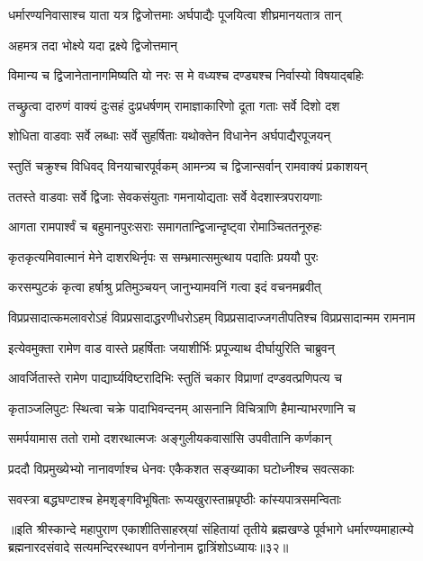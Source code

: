 \twolineshloka
{धर्मारण्यनिवासाश्च याता यत्र द्विजोत्तमाः}
{अर्घपाद्यैः पूजयित्वा शीघ्रमानयतात्र तान्}%

\onelineshloka
{अहमत्र तदा भोक्ष्ये यदा द्रक्ष्ये द्विजोत्तमान्}%

\twolineshloka
{विमान्य च द्विजानेतानागमिष्यति यो नरः}
{स मे वध्यश्च दण्ड्यश्च निर्वास्यो विषयाद्बहिः}%

\twolineshloka
{तच्छ्रुत्वा दारुणं वाक्यं दुःसहं दुःप्रधर्षणम्}
{रामाज्ञाकारिणो दूता गताः सर्वे दिशो दश}%

\twolineshloka
{शोधिता वाडवाः सर्वे लब्धाः सर्वे सुहर्षिताः}
{यथोक्तेन विधानेन अर्घपाद्यैरपूजयन्}%

\twolineshloka
{स्तुतिं चक्रुश्च विधिवद् विनयाचारपूर्वकम्}
{आमन्त्र्य च द्विजान्सर्वान् रामवाक्यं प्रकाशयन्}%

\twolineshloka
{ततस्ते वाडवाः सर्वे द्विजाः सेवकसंयुताः}
{गमनायोद्यताः सर्वे वेदशास्त्रपरायणाः}%

\twolineshloka
{आगता रामपार्श्वं च बहुमानपुरःसराः}
{समागतान्द्विजान्दृष्ट्वा रोमाञ्चिततनूरुहः}%

\twolineshloka
{कृतकृत्यमिवात्मानं मेने दाशरथिर्नृपः}
{स सम्भ्रमात्समुत्थाय पदातिः प्रययौ पुरः}%

\twolineshloka
{करसम्पुटकं कृत्वा हर्षाश्रु प्रतिमुञ्चयन्}
{जानुभ्यामवनिं गत्वा इदं वचनमब्रवीत्}%

\twolineshloka
{विप्रप्रसादात्कमलावरोऽहं विप्रप्रसादाद्धरणीधरोऽहम्}
{विप्रप्रसादाज्जगतीपतिश्च विप्रप्रसादान्मम रामनाम}%

\twolineshloka
{इत्येवमुक्ता रामेण वाड वास्ते प्रहर्षिताः}
{जयाशीर्भिः प्रपूज्याथ दीर्घायुरिति चाब्रुवन्}%

\twolineshloka
{आवर्जितास्ते रामेण पाद्यार्घ्यविष्टरादिभिः}
{स्तुतिं चकार विप्राणां दण्डवत्प्रणिपत्य च}%

\twolineshloka
{कृताञ्जलिपुटः स्थित्वा चक्रे पादाभिवन्दनम्}
{आसनानि विचित्राणि हैमान्याभरणानि च}%

\twolineshloka
{समर्पयामास ततो रामो दशरथात्मजः}
{अङ्गुलीयकवासांसि उपवीतानि कर्णकान्}%

\twolineshloka
{प्रददौ विप्रमुख्येभ्यो नानावर्णाश्च धेनवः}
{एकैकशत सङ्ख्याका घटोध्नीश्च सवत्सकाः}%

\twolineshloka
{सवस्त्रा बद्धघण्टाश्च हेमशृङ्गविभूषिताः}
{रूप्यखुरास्ताम्रपृष्ठीः कांस्यपात्रसमन्विताः}%

॥इति श्रीस्कान्दे महापुराण एकाशीतिसाहस्र्यां संहितायां तृतीये ब्रह्मखण्डे पूर्वभागे धर्मारण्यमाहात्म्ये ब्रह्मनारदसंवादे सत्यमन्दिरस्थापन वर्णनोनाम द्वात्रिंशोऽध्यायः॥३२॥

